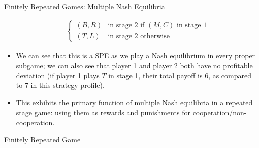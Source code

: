 \documentclass[8pt]{extarticle}
\begin{document}
\begin{problem}{Finitely Repeated Games: Multiple Nash Equilibria}
\begin{itemize}
\begin{align*}
\begin{cases}
            (B,R) & \text{in stage 2 if $(M,C)$ in stage 1}\\
            (T,L) & \text{in stage 2 otherwise}
          \end{cases}
        \end{align*}
      \item We can see that this is a SPE as we play a Nash equilibrium in every proper subgame; we can also see that player 1 and player 2 both have no profitable deviation (if player 1 plays $T$ in stage 1, their total payoff is $6$, as compared to $7$ in this strategy profile).
      \item This exhibits the primary function of multiple Nash equilibria in a repeated stage game: using them as rewards and punishments for cooperation/non-cooperation.
    \end{itemize}
  \end{problem}
  \begin{problem}{Finitely Repeated Game}
    \begin{tcbraster}[raster columns = 1,colframe = black!75!white,colback=white]
    \end{tcbraster}
  \end{problem}
\end{document}
